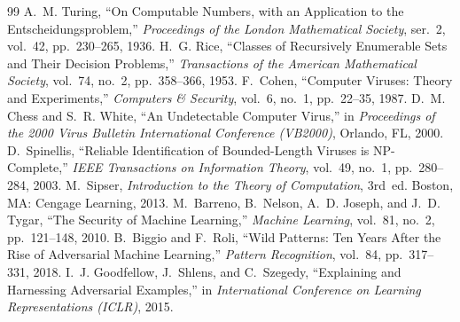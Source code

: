 \documentclass[11pt]{article}
\theoremstyle{plain}
\theoremstyle{definition}
\begin{document}
\begin{thebibliography}{99}
 A.~M. Turing, ``On Computable Numbers, with an
  Application to the Entscheidungsproblem,'' \emph{Proceedings of the London
  Mathematical Society}, ser.~2, vol.~42, pp.~230--265, 1936.
 H.~G. Rice, ``Classes of Recursively Enumerable Sets and
  Their Decision Problems,'' \emph{Transactions of the American Mathematical
  Society}, vol.~74, no.~2, pp.~358--366, 1953.
 F.~Cohen, ``Computer Viruses: Theory and Experiments,''
  \emph{Computers \& Security}, vol.~6, no.~1, pp.~22--35, 1987.
 D.~M. Chess and S.~R. White, ``An Undetectable
  Computer Virus,'' in \emph{Proceedings of the 2000 Virus Bulletin
  International Conference (VB2000)}, Orlando, FL, 2000.
 D.~Spinellis, ``Reliable Identification of
  Bounded-Length Viruses is NP-Complete,'' \emph{IEEE Transactions on
  Information Theory}, vol.~49, no.~1, pp.~280--284, 2003.
 M.~Sipser, \emph{Introduction to the Theory of
  Computation}, 3rd~ed. Boston, MA: Cengage Learning, 2013.
 M.~Barreno, B.~Nelson, A.~D. Joseph, and J.~D. Tygar,
  ``The Security of Machine Learning,'' \emph{Machine Learning}, vol.~81,
  no.~2, pp.~121--148, 2010.
 B.~Biggio and F.~Roli, ``Wild Patterns: Ten Years
  After the Rise of Adversarial Machine Learning,'' \emph{Pattern Recognition},
  vol.~84, pp.~317--331, 2018.
 I.~J. Goodfellow, J.~Shlens, and C.~Szegedy,
  ``Explaining and Harnessing Adversarial Examples,'' in \emph{International
  Conference on Learning Representations (ICLR)}, 2015.
\end{thebibliography}
\end{document}
